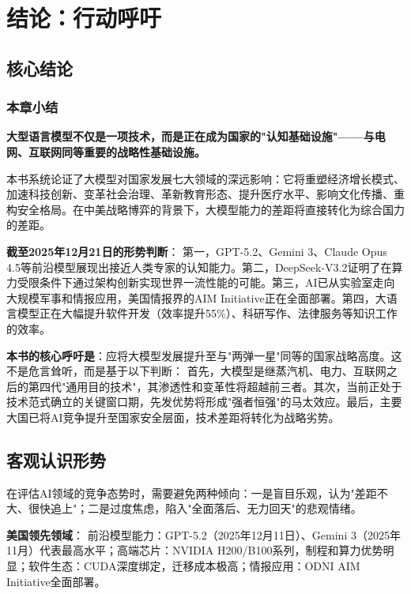 \chapter{结论：行动呼吁}

\section{核心结论}

\subsection*{本章小结}

\textbf{大型语言模型不仅是一项技术，而是正在成为国家的"认知基础设施"——与电网、互联网同等重要的战略性基础设施。}

本书系统论证了大模型对国家发展七大领域的深远影响：它将重塑经济增长模式、加速科技创新、变革社会治理、革新教育形态、提升医疗水平、影响文化传播、重构安全格局。在中美战略博弈的背景下，大模型能力的差距将直接转化为综合国力的差距。

\textbf{截至2025年12月21日的形势判断}：
第一，GPT-5.2、Gemini 3、Claude Opus 4.5等前沿模型展现出接近人类专家的认知能力。第二，DeepSeek-V3.2证明了在算力受限条件下通过架构创新实现世界一流性能的可能。第三，AI已从实验室走向大规模军事和情报应用，美国情报界的AIM Initiative正在全面部署。第四，大语言模型正在大幅提升软件开发（效率提升55\%）、科研写作、法律服务等知识工作的效率。

\textbf{本书的核心呼吁是}：应将大模型发展提升至与"两弹一星"同等的国家战略高度。这不是危言耸听，而是基于以下判断：
首先，大模型是继蒸汽机、电力、互联网之后的第四代"通用目的技术"，其渗透性和变革性将超越前三者。其次，当前正处于技术范式确立的关键窗口期，先发优势将形成"强者恒强"的马太效应。最后，主要大国已将AI竞争提升至国家安全层面，技术差距将转化为战略劣势。

\section{客观认识形势}

在评估AI领域的竞争态势时，需要避免两种倾向：一是盲目乐观，认为"差距不大、很快追上"；二是过度焦虑，陷入"全面落后、无力回天"的悲观情绪。

\textbf{美国领先领域}：
前沿模型能力：GPT-5.2（2025年12月11日）、Gemini 3（2025年11月）代表最高水平；高端芯片：NVIDIA H200/B100系列，制程和算力优势明显；软件生态：CUDA深度绑定，迁移成本极高；情报应用：ODNI AIM Initiative全面部署。

